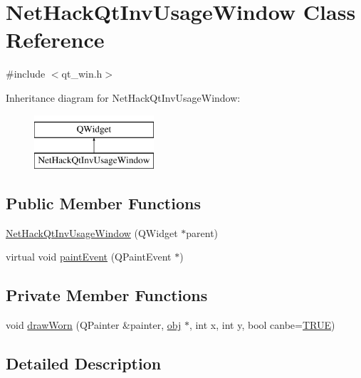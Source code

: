 \hypertarget{classNetHackQtInvUsageWindow}{\section{Net\+Hack\+Qt\+Inv\+Usage\+Window Class Reference}
\label{classNetHackQtInvUsageWindow}
}


{\ttfamily \#include $<$qt\+\_\+win.\+h$>$}

Inheritance diagram for Net\+Hack\+Qt\+Inv\+Usage\+Window\+:\begin{figure}[H]
\begin{center}
\leavevmode
\includegraphics[height=2.000000cm]{classNetHackQtInvUsageWindow}
\end{center}
\end{figure}
\subsection*{Public Member Functions}
\begin{DoxyCompactItemize}
\item 
\hyperlink{classNetHackQtInvUsageWindow_ae3bee9bf31d0f6a8bdfe6b0cfc8f3e08}{Net\+Hack\+Qt\+Inv\+Usage\+Window} (Q\+Widget $\ast$parent)
\item 
virtual void \hyperlink{classNetHackQtInvUsageWindow_a2be54589dac0abc30e7b2b73d6050a71}{paint\+Event} (Q\+Paint\+Event $\ast$)
\end{DoxyCompactItemize}
\subsection*{Private Member Functions}
\begin{DoxyCompactItemize}
\item 
void \hyperlink{classNetHackQtInvUsageWindow_ac9a317affe349877b3890a3e670a8d24}{draw\+Worn} (Q\+Painter \&painter, \hyperlink{structobj}{obj} $\ast$, int x, int y, bool canbe=\hyperlink{xpm2img_8c_aa8cecfc5c5c054d2875c03e77b7be15d}{T\+R\+U\+E})
\end{DoxyCompactItemize}


\subsection{Detailed Description}


